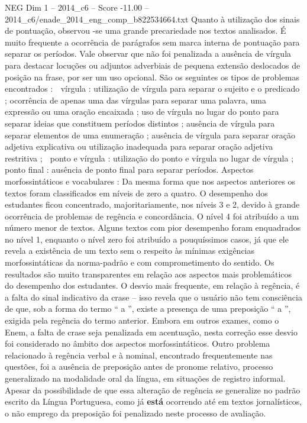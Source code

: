 \begin{textsample}{NEG Dim 1 – 2014\_c6 – Score -11.00 – 2014\_c6/enade\_2014\_eng\_comp\_b822534664.txt}
Quanto à utilização dos sinais de pontuação, observou -se uma grande precariedade nos textos analisados.
É muito frequente a ocorrência de parágrafos sem marca interna de pontuação para separar os períodos.
Vale observar que não foi penalizada a ausência de vírgula para destacar locuções ou adjuntos adverbiais de pequena extensão deslocados de posição na frase, por ser um uso opcional.
São os seguintes os tipos de problemas encontrados :  vírgula : utilização de vírgula para separar o sujeito e o predicado ; ocorrência de apenas uma das vírgulas para separar uma palavra, uma expressão ou uma oração encaixada ; uso de vírgula no lugar do ponto para separar ideias que constituem períodos distintos ; ausência de vírgula para separar elementos de uma enumeração ; ausência de vírgula para separar oração adjetiva explicativa ou utilização inadequada para separar oração adjetiva restritiva ;  ponto e vírgula : utilização do ponto e vírgula no lugar de vírgula ;  ponto final : ausência de ponto final para separar períodos.
Aspectos morfossintáticos e vocabulares : Da mesma forma que nos aspectos anteriores os textos foram classificados em níveis de zero a quatro.
O desempenho dos estudantes ficou concentrado, majoritariamente, nos níveis 3 e 2, devido à grande ocorrência de problemas de regência e concordância.
O nível 4 foi atribuído a um número menor de textos.
Alguns textos com pior desempenho foram enquadrados no nível 1, enquanto o nível zero foi atribuído a pouquíssimos casos, já que ele revela a existência de um texto sem o respeito às mínimas exigências morfossintáticas da norma-padrão e com comprometimento do sentido.
Os resultados são muito transparentes em relação aos aspectos mais problemáticos do desempenho dos estudantes.
O desvio mais frequente, em relação à regência, é a falta do sinal indicativo da crase – isso revela que o usuário não tem consciência de que, sob a forma do termo “ a ”, existe a presença de uma preposição “ a ”, exigida pela regência do termo anterior.
Embora em outros exames, como o Enem, a falta de crase seja penalizada em acentuação, nesta correção esse desvio foi considerado no âmbito dos aspectos morfossintáticos.
Outro problema relacionado à regência verbal e à nominal, encontrado frequentemente nas questões, foi a ausência de preposição antes de pronome relativo, processo generalizado na modalidade oral da língua, em situações de registro informal.
Apesar da possibilidade de que essa alteração de regência se generalize no padrão escrito da Língua Portuguesa, como já \textbf{está} ocorrendo até em textos jornalísticos, o não emprego da preposição foi penalizado neste processo de avaliação.

\end{textsample}
